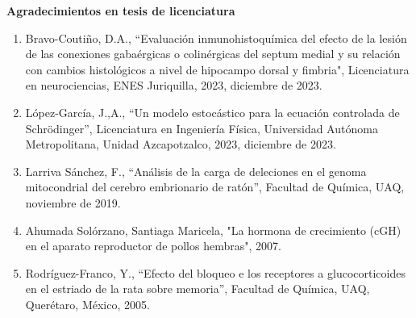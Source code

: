 \textbf{Agradecimientos en tesis de licenciatura}

\begin{enumerate}

\item Bravo-Coutiño, D.A., “Evaluación inmunohistoquímica del efecto de la lesión de las conexiones gabaérgicas o colinérgicas del septum medial y su relación 
con 
cambios histológicos a nivel de hipocampo dorsal y fimbria", Licenciatura en neurociencias, ENES Juriquilla, 2023,  diciembre de 2023.

\item López-García, J.,A., “Un modelo estocástico para la ecuación controlada de Schrödinger”, Licenciatura en Ingeniería Física, Universidad Autónoma 
Metropolitana, 
Unidad Azcapotzalco, 2023,  diciembre de 2023.

\item Larriva Sánchez, F., “Análisis de la carga de deleciones en el genoma mitocondrial del cerebro embrionario de ratón”, Facultad de Química, UAQ,  noviembre 
de 
2019.

\item Ahumada Solórzano, Santiaga Maricela, "La hormona de crecimiento (cGH) en el aparato reproductor de pollos hembras",  2007.

\item Rodríguez-Franco, Y., “Efecto del bloqueo e los receptores a glucocorticoides en el estriado de la rata sobre memoria”, Facultad de Química, UAQ, 
Querétaro, 
México,  2005.

\end{enumerate}

